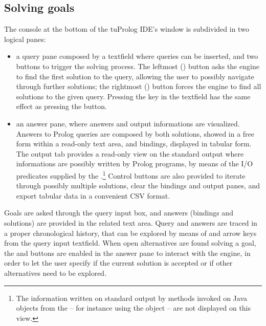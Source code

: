 \subsection{Solving goals}

The console at the bottom of the tuProlog IDE's window is subdivided in two logical panes:
%
\begin{itemize}
\item a query pane composed by a textfield where queries can be inserted, and two buttons to trigger the solving process.
%
The leftmost () button asks the engine to find the first solution to the query, allowing the user to possibly navigate through further solutions;
%
the rightmost () button forces the engine to find all solutions to the given query.
%
Pressing the  key in the textfield has the same effect as pressing the  button.
\item an answer pane, where answers and output informations are visualized.
%
Answers to Prolog queries are composed by both solutions, showed in a free form within a read-only text area, and bindings, displayed in tabular form.
%
The output tab provides a read-only view on the standard output where informations are possibly written by Prolog programs, by means of the I/O predicates supplied by the .\footnote{The information written on standard output by methods invoked on Java objects from the  -- for instance using the  object -- are not displayed on this view.}
%
Control buttons are also provided to iterate through possibly multiple solutions, clear the bindings and output panes, and export tabular data in a convenient CSV format.
\end{itemize}
%
Goals are asked through the query input box, and answers (bindings and solutions) are provided in the related text area.
%
Query and answers are traced in a proper chronological history, that can be explored by means of  and  arrow keys from the query input textfield.
%
When open alternatives are found solving a goal, the  and  buttons are enabled in the answer pane to interact with the engine, in order to let the user specify if the current solution is accepted or if other alternatives need to be explored.

